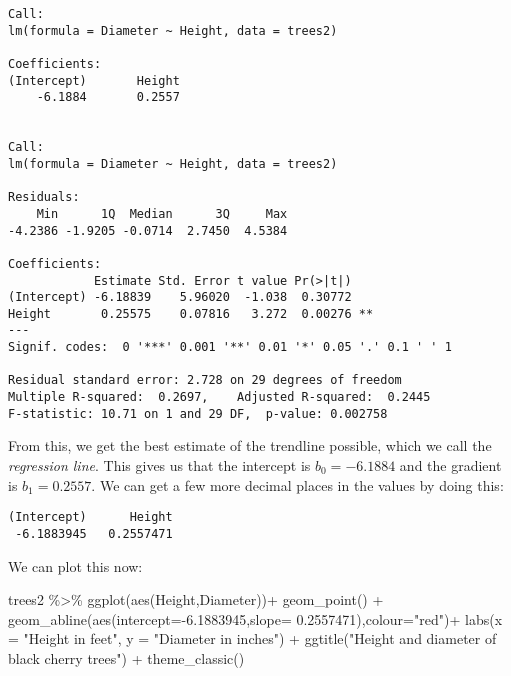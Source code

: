 \documentclass[
]{article}
\newenvironment{Shaded}{\begin{snugshade}}{\end{snugshade}}
\newcommand{\AttributeTok}[1]{\textcolor[rgb]{0.77,0.63,0.00}{#1}}
\newcommand{\FloatTok}[1]{\textcolor[rgb]{0.00,0.00,0.81}{#1}}
\newcommand{\FunctionTok}[1]{\textcolor[rgb]{0.00,0.00,0.00}{#1}}
\newcommand{\NormalTok}[1]{#1}
\newcommand{\SpecialCharTok}[1]{\textcolor[rgb]{0.00,0.00,0.00}{#1}}
\newcommand{\StringTok}[1]{\textcolor[rgb]{0.31,0.60,0.02}{#1}}
\begin{document}
\begin{verbatim}
Call:
lm(formula = Diameter ~ Height, data = trees2)

Coefficients:
(Intercept)       Height  
    -6.1884       0.2557  


Call:
lm(formula = Diameter ~ Height, data = trees2)

Residuals:
    Min      1Q  Median      3Q     Max 
-4.2386 -1.9205 -0.0714  2.7450  4.5384 

Coefficients:
            Estimate Std. Error t value Pr(>|t|)   
(Intercept) -6.18839    5.96020  -1.038  0.30772   
Height       0.25575    0.07816   3.272  0.00276 **
---
Signif. codes:  0 '***' 0.001 '**' 0.01 '*' 0.05 '.' 0.1 ' ' 1

Residual standard error: 2.728 on 29 degrees of freedom
Multiple R-squared:  0.2697,    Adjusted R-squared:  0.2445 
F-statistic: 10.71 on 1 and 29 DF,  p-value: 0.002758
\end{verbatim}

From this, we get the best estimate of the trendline possible, which we
call the \emph{regression line}. This gives us that the intercept is
\(b_0=-6.1884\) and the gradient is \(b_1=0.2557\). We can get a few
more decimal places in the values by doing this:

\begin{Shaded}
\end{Shaded}

\begin{verbatim}
(Intercept)      Height 
 -6.1883945   0.2557471 
\end{verbatim}

We can plot this now:

\begin{Shaded}
\begin{Highlighting}[]
\NormalTok{trees2 }\SpecialCharTok{\%\textgreater{}\%} \FunctionTok{ggplot}\NormalTok{(}\FunctionTok{aes}\NormalTok{(Height,Diameter))}\SpecialCharTok{+}
      \FunctionTok{geom\_point}\NormalTok{() }\SpecialCharTok{+}
      \FunctionTok{geom\_abline}\NormalTok{(}\FunctionTok{aes}\NormalTok{(}\AttributeTok{intercept=}\SpecialCharTok{{-}}\FloatTok{6.1883945}\NormalTok{,}\AttributeTok{slope=} \FloatTok{0.2557471}\NormalTok{),}\AttributeTok{colour=}\StringTok{"red"}\NormalTok{)}\SpecialCharTok{+}
      \FunctionTok{labs}\NormalTok{(}\AttributeTok{x =} \StringTok{"Height in feet"}\NormalTok{, }\AttributeTok{y =} \StringTok{"Diameter in inches"}\NormalTok{) }\SpecialCharTok{+}
      \FunctionTok{ggtitle}\NormalTok{(}\StringTok{"Height and diameter of black cherry trees"}\NormalTok{) }\SpecialCharTok{+}
      \FunctionTok{theme\_classic}\NormalTok{()}
\end{Highlighting}
\end{Shaded}
\end{document}
